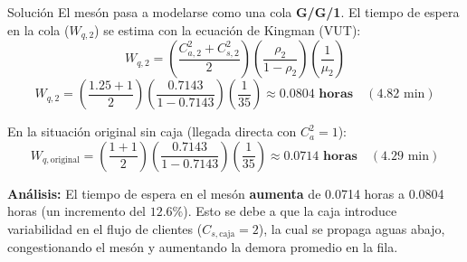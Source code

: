 \documentclass[11pt, a4paper]{article}
\begin{document}
\begin{ejercicio}{Solución}
  El mesón pasa a modelarse como una cola \textbf{G/G/1}. El tiempo de espera en la cola ($W_{q,2}$) se estima con la ecuación de Kingman (VUT):
  \begin{equation*}
    W_{q,2} = \left( \frac{C_{a,2}^2 + C_{s,2}^2}{2} \right) \left( \frac{\rho_2}{1 - \rho_2} \right) \left( \frac{1}{\mu_2} \right)
  \end{equation*}
  \begin{equation*}
    W_{q,2} = \left( \frac{1.25 + 1}{2} \right) \left( \frac{0.7143}{1 - 0.7143} \right) \left( \frac{1}{35} \right) \approx \mathbf{0.0804 \text{ horas}} \quad (4.82 \text{ min})
  \end{equation*}

  En la situación original sin caja (llegada directa con $C_{a}^2 = 1$):
  \begin{equation*}
    W_{q,\text{original}} = \left( \frac{1 + 1}{2} \right) \left( \frac{0.7143}{1 - 0.7143} \right) \left( \frac{1}{35} \right) \approx \mathbf{0.0714 \text{ horas}} \quad (4.29 \text{ min})
  \end{equation*}

  \textbf{Análisis:} El tiempo de espera en el mesón \textbf{aumenta} de 0.0714 horas a 0.0804 horas (un incremento del $12.6\%$). Esto se debe a que la caja introduce variabilidad en el flujo de clientes ($C_{s,\text{caja}} = 2$), la cual se propaga aguas abajo, congestionando el mesón y aumentando la demora promedio en la fila.

\end{ejercicio}

\newpage
\end{document}
